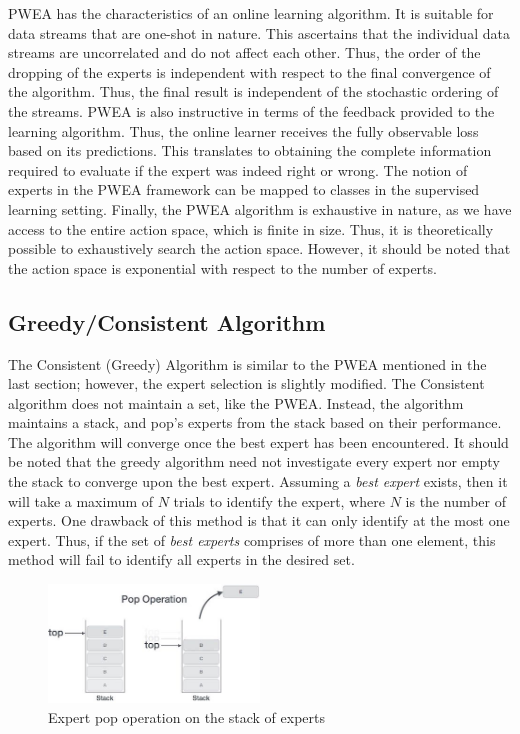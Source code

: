 \documentclass[11pt]{article}
\begin{document}
PWEA has the characteristics of an online learning algorithm. It is suitable for data streams that are one-shot in nature. This ascertains that the individual data streams are uncorrelated and do not affect each other. Thus, the order of the dropping of the experts is independent with respect to the final convergence of the algorithm. Thus, the final result is independent of the stochastic ordering of the streams. PWEA is also instructive in terms of the feedback provided to the learning algorithm. Thus, the online learner receives the fully observable loss based on its predictions. This translates to obtaining the complete information required to evaluate if the expert was indeed right or wrong. The notion of experts in the PWEA framework can be mapped to classes in the supervised learning setting. Finally, the PWEA algorithm is exhaustive in nature, as we have access to the entire action space, which is finite in size. Thus, it is theoretically possible to exhaustively search the action space. However, it should be noted that the action space is exponential with respect to the number of experts.

\subsection{Greedy/Consistent Algorithm}
\normalfont
The Consistent (Greedy) Algorithm is similar to the PWEA mentioned in the last section; however, the expert selection is slightly modified. The Consistent algorithm does not maintain a set, like the PWEA. Instead, the algorithm maintains a stack, and pop's experts from the stack based on their performance. The algorithm will converge once the best expert has been encountered. It should be noted that the greedy algorithm need not investigate every expert nor empty the stack to converge upon the best expert. Assuming a \textit{best expert} exists, then it will take a maximum of $N$ trials to identify the expert, where $N$ is the number of experts. One drawback of this method is that it can only identify at the most one expert. Thus, if the set of \textit{best experts} comprises of more than one element, this method will fail to identify all experts in the desired set.

\begin{figure}[ht]
    \centering
    \includegraphics[width=0.5\textwidth]{stack_pop_operation.jpg}
    \caption{Expert pop operation on the stack of experts}
    \label{fig:stack pop}
\end{figure}
\end{document}
